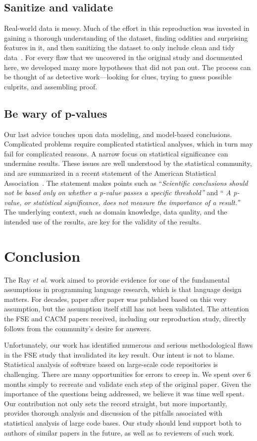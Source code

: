 \documentclass[acmsmall]{acmart}
\newcommand{\ea}{\emph{et al.}\xspace}
\begin{document}
\subsection{Sanitize and validate} Real-world data is messy.
Much of the effort in this reproduction was invested in gaining a thorough
understanding of the dataset, finding oddities and surprising features in
it, and then sanitizing the dataset to only include clean and tidy
data~\cite{hadley}. For every flaw that we uncovered in the original study
and documented here, we developed many more hypotheses that did not pan out.
The process can be thought of as detective work---looking for clues, trying
to guess possible culprits, and assembling proof.

\subsection{Be wary of  p-values}
Our last advice touches upon data modeling, and model-based
conclusions. Complicated problems require complicated statistical analyses,
which in turn may fail for complicated reasons. A narrow focus on
statistical significance can undermine results. These issues are well
understood by the statistical community, and are summarized in a recent
statement of the American Statistical Association~\cite{lazar}. The
statement makes points such as {``\it Scientific conclusions should not be
  based only on whether a p-value passes a specific threshold''} and {``\it
  A p-value, or statistical significance, does not measure the importance of
  a result.''}  The underlying context, such as domain knowledge, data
quality, and the intended use of the results, are key for the validity of
the results.


\section{Conclusion}

The Ray \ea work aimed to provide evidence for one of the fundamental
assumptions in programming language research, which is that language design
matters. For decades, paper after paper was published based on this very
assumption, but the assumption itself still has not been validated. The
attention the FSE and CACM papers received, including our reproduction
study, directly follows from the community's desire for answers.

Unfortunately, our work has identified numerous and serious methodological
flaws in the FSE study that invalidated its key result.  Our intent is not
to blame. Statistical analysis of software based on large-scale code
repositories is challenging. There are many opportunities for errors to
creep in. We spent over 6 months simply to recreate and validate each step
of the original paper.  Given the importance of the questions being
addressed, we believe it was time well spent. Our contribution not only sets
the record straight, but more importantly, provides thorough analysis and
discussion of the pitfalls associated with statistical analysis of large
code bases. Our study should lend support both to authors of similar papers
in the future, as well as to reviewers of such work.
\end{document}
